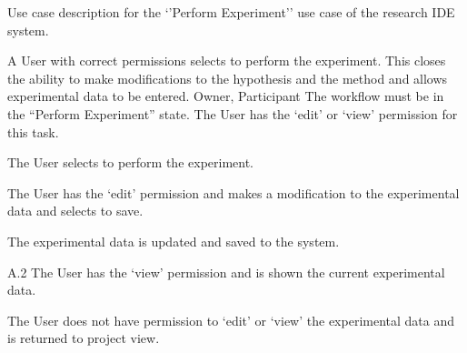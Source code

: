 \documentclass[document.tex]{subfiles}
\begin{document}
\begin{table}
  \centering
  \caption{Use case description for the `'Perform Experiment'' use case of the research IDE system.}
  \label{tbl:use-case-perform-experiment}

  \begin{usecase}
    A User with correct permissions selects to perform the experiment. This closes the ability to make modifications to the hypothesis and the method  and allows experimental data to be entered.
    Owner, Participant
    The workflow must be in the “Perform Experiment” state. The User has the ‘edit’ or ‘view’ permission for this task.
    \ucnormal
    \begin{ucenum}
      \item The User selects to perform the experiment.
      \item The User has the ‘edit’ permission and makes a modification to the experimental data and selects to save.
      \item The experimental data is updated and saved to the system.
    \end{ucenum}
    \begin{ucenum}
      \item [A.2] The User has the ‘view’ permission and is shown the current experimental data.
    \end{ucenum}
    The User does not have permission to ‘edit’ or ‘view’ the experimental data and is returned to project view.
  \end{usecase}
\end{table}
\end{document}
